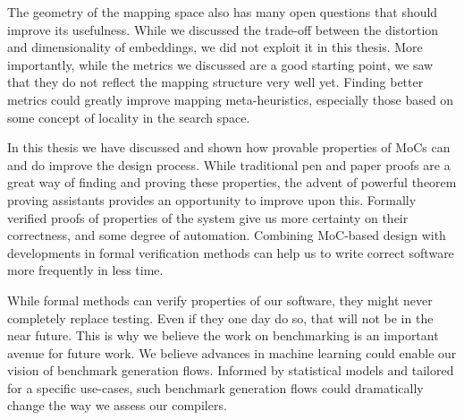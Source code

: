 The geometry of the mapping space also has many open questions that should improve its usefulness.
While we discussed the trade-off between the distortion and dimensionality of embeddings, we did not exploit it in this thesis.
More importantly, while the metrics we discussed are a good starting point, we saw that they do not reflect the mapping structure very well yet.
Finding better metrics could greatly improve mapping meta-heuristics, especially those based on some concept of locality in the search space.

In this thesis we have discussed and shown how provable properties of \acp{MoC} can and do improve the design process.
While traditional pen and paper proofs are a great way of finding and proving these properties, the advent of powerful theorem proving assistants provides an opportunity to improve upon this.
Formally verified proofs of properties of the system give us more certainty on their correctness, and some degree of automation.
Combining \ac{MoC}-based design with developments in formal verification methods can help us to write correct software more frequently in less time.

While formal methods can verify properties of our software, they might never completely replace testing.
Even if they one day do so, that will not be in the near future.
This is why we believe the work on benchmarking is an important avenue for future work.
We believe advances in machine learning could enable our vision of benchmark generation flows.
Informed by statistical models and tailored for a specific use-cases, such benchmark generation flows could dramatically change the way we assess our compilers.
